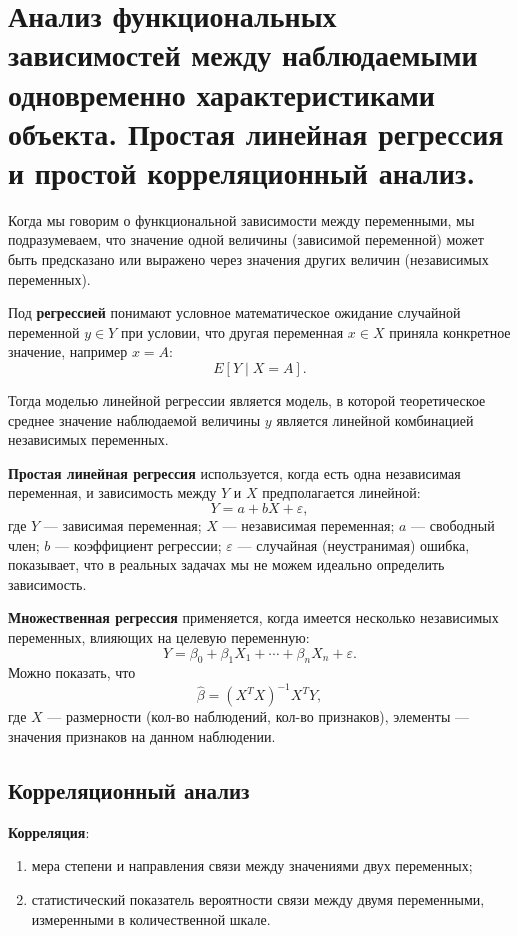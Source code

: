 \section{Анализ функциональных зависимостей между наблюдаемыми одновременно характеристиками объекта. Простая линейная регрессия и простой корреляционный анализ.}

Когда мы говорим о функциональной зависимости между переменными, мы подразумеваем, что значение одной величины (зависимой переменной) может быть предсказано или выражено через значения других величин (независимых переменных).

Под \textbf{регрессией} понимают условное математическое ожидание случайной переменной $y \in Y$ при условии, что другая переменная $x \in X$ приняла конкретное значение, например $x=A$:
\[
  E[Y \mid X=A].
\]

Тогда моделью линейной регрессии является модель, в которой теоретическое среднее значение наблюдаемой величины $y$ является линейной комбинацией независимых переменных.

\textbf{Простая линейная регрессия} используется, когда есть одна независимая переменная, и зависимость между $Y$ и $X$ предполагается линейной:
\[
  Y = a + bX + \varepsilon,
\]
где $Y$ — зависимая переменная; $X$ — независимая переменная; $a$ — свободный член; $b$ — коэффициент регрессии; $\varepsilon$ — случайная (неустранимая) ошибка, показывает, что в реальных задачах мы не можем идеально определить зависимость.

\textbf{Множественная регрессия} применяется, когда имеется несколько независимых переменных, влияющих на целевую переменную:
\[
  Y = \beta_0 + \beta_1 X_1 + \cdots + \beta_n X_n + \varepsilon.
\]
Можно показать, что
\[
  \hat{\beta} = (X^T X)^{-1}X^TY,
\]
где $X$ — размерности (кол-во наблюдений, кол-во признаков), элементы — значения признаков на данном наблюдении.

\subsection*{Корреляционный анализ}

\textbf{Корреляция}:
\begin{enumerate}
  \item мера степени и направления связи между значениями двух переменных;
  \item статистический показатель вероятности связи между двумя переменными, измеренными в количественной шкале.
\end{enumerate}

